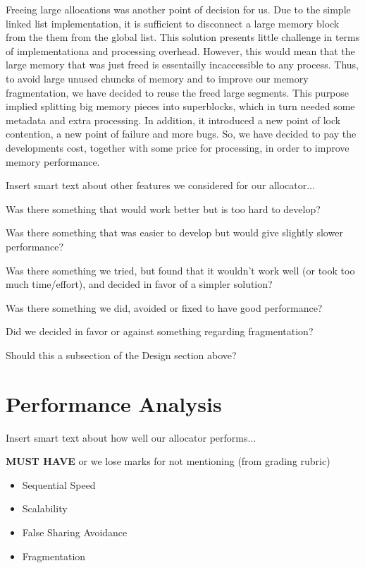 \documentclass{article}
\begin{document}
Freeing large allocations was another point of decision for us. Due to the
simple linked list implementation, it is sufficient to disconnect a large 
memory block from the them from the global list. This solution presents 
little challenge in terms of implementationa and processing overhead. 
However, this would mean that the large memory that was just freed is
essentailly incaccessible to any process. Thus, to avoid large unused chuncks
of memory and to improve our memory fragmentation, we have decided to 
reuse the freed large segments. This purpose implied splitting big memory 
pieces into superblocks, which in turn needed some metadata and extra 
processing. In addition, it introduced a new point of lock contention, a new 
point of failure and more bugs. So, we have decided to pay the developments 
cost, together with some price for processing, in order to improve memory
performance.

Insert smart text about other features we considered for our allocator...

Was there something that would work better but is too hard to develop?

Was there something that was easier to develop but would give slightly slower
performance?

Was there something we tried, but found that it wouldn't work well (or took too 
much time/effort), and decided in favor of a simpler solution?

Was there something we did, avoided or fixed to have good performance?

Did we decided in favor or against something regarding fragmentation?

Should this a subsection of the Design section above?



\newpage
\section{Performance Analysis}
\label{sec:performance}

Insert smart text about how well our allocator performs...

\textbf{MUST HAVE} or we lose marks for not mentioning (from grading rubric)
\begin{itemize}
	\item Sequential Speed
	\item Scalability
	\item False Sharing Avoidance
	\item Fragmentation
\end{itemize}
\end{document}
